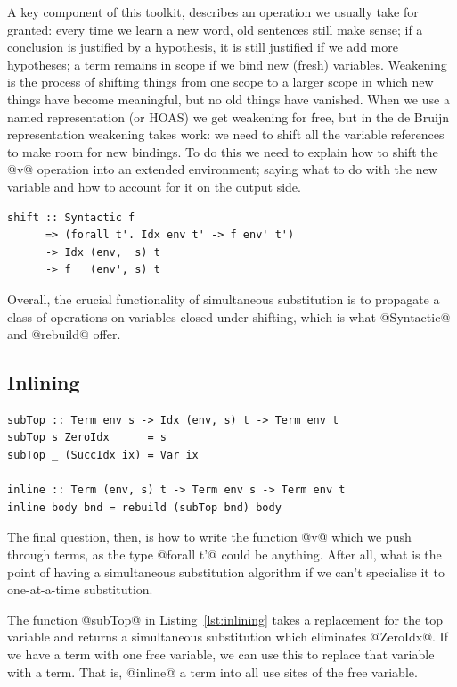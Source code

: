 A key component of this toolkit,  describes an operation we
usually take for granted: every time we learn a new word, old sentences still
make sense; if a conclusion is justified by a hypothesis, it is still justified
if we add more hypotheses; a term remains in scope if we bind new (fresh)
variables. Weakening is the process of shifting things from one scope to a
larger scope in which new things have become meaningful, but no old things have
vanished. When we use a named representation (or HOAS) we get weakening
for free, but in the de Bruijn representation weakening takes
work: we need to shift all the variable references to make room for new
bindings. To do this we need to explain how to shift the @v@ operation into
an extended environment; saying what to do with the new variable and how to
account for it on the output side.
%
\begin{lstlisting}[style=haskell]
shift :: Syntactic f
      => (forall t'. Idx env t' -> f env' t')
      -> Idx (env,  s) t
      -> f   (env', s) t
\end{lstlisting}
%
Overall, the crucial functionality of simultaneous substitution is to propagate
a class of operations on variables closed under shifting, which is what
@Syntactic@ and @rebuild@ offer.


\subsection{Inlining}
\label{sec:inlining}

\begin{lstlisting}[style=haskell_float
    ,label=lst:inlining
    ,caption={A simultaneous substitution to inline terms}]
subTop :: Term env s -> Idx (env, s) t -> Term env t
subTop s ZeroIdx      = s
subTop _ (SuccIdx ix) = Var ix

inline :: Term (env, s) t -> Term env s -> Term env t
inline body bnd = rebuild (subTop bnd) body
\end{lstlisting}

The final question, then, is how to write the function @v@ which we push
through terms, as the type @forall t'@ could be anything. After all, what
is the point of having a simultaneous substitution algorithm if we can't
specialise it to one-at-a-time substitution.

The function @subTop@ in Listing~\ref{lst:inlining} takes a replacement for the
top variable and returns a simultaneous substitution which eliminates @ZeroIdx@.
If we have a term with one free variable, we can use this to replace that
variable with a term. That is, @inline@ a term into all use sites of the free
variable.

